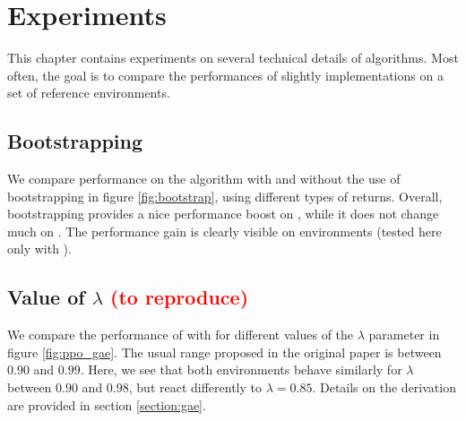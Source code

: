 \chapter{Experiments}

This chapter contains experiments on several technical details of algorithms. Most often, the goal is to compare the performances of slightly implementations on a set of reference environments.

\section{Bootstrapping}

We compare performance on the \ppo algorithm with and without the use of bootstrapping in figure \ref{fig:bootstrap}, using different types of returns. Overall, bootstrapping provides a nice performance boost on , while it does not change much on . The performance gain is clearly visible on \mujoco environments (tested here only with \gae).



\section{Value of \gae $\lambda$ \textcolor{red}{(to reproduce)}}

We compare the performance of \ppo with \gae for different values of the $\lambda$ parameter in figure \ref{fig:ppo_gae}. The usual range proposed in the original paper \cite{gae} is between $0.90$ and $0.99$. Here, we see that both environments behave similarly for $\lambda$ between $0.90$ and $0.98$, but react differently to $\lambda = 0.85$. Details on the \gae derivation are provided in section \ref{section:gae}.



